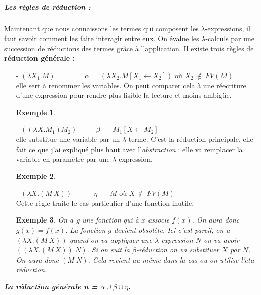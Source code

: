 \documentclass[10pt,a4paper]{report}
\newtheorem{ex}{Exemple}
\begin{document}
\subparagraph{Les règles de réduction :}
Maintenant que nous connaissons les termes qui composent les $\lambda$-expressions, il faut savoir
comment les faire interagir entre eux. On évalue les $\lambda$-calculs par une succession de réductions des termes grâce à
l'application. Il existe trois règles de \textbf{réduction générale :}
\begin{itemize}
\item[-] $(\lambda X_{1}.M)~~~~~~~~~~~~~~~~~~~\alpha~~~~~~~(\lambda X_{2}.M[X_{1} \leftarrow X_{2}])$
  où $X_{2}~\notin~FV(M)$ 
  \\
  elle sert à renommer les variables. On peut comparer cela à une réecriture d'une expression pour rendre plus lisible la lecture et moins ambigüe.
  \begin{ex}
  	
  \end{ex}
\item[-] $((\lambda X.M_{1})M_{2})~~~~~~~~~~~~\beta~~~~~~~~M_{1}[X \leftarrow M_{2}]$ 
\\
elle substitue une variable par un $\lambda$-terme. C'est la réduction principale, elle fait ce que j'ai expliqué plus haut avec l'\textit{abstraction} : elle va remplacer la variable en paramètre par une $\lambda$-expression.
\begin{ex}
	
\end{ex}
\item[-] $(\lambda X.(M~X))~~~~~~~~~~~~~~\eta~~~~~~~~M$ 
  où $X~\notin~FV(M)$ 
  \\ Cette règle traite le cas particulier d'une fonction inutile.
  \begin{ex}
  	On a $g$ une fonction qui à $x$ associe $f(x)$. On aura donc $g(x) = f(x)$. La fonction $g$ devient obsolète. Ici c'est pareil, on a $(\lambda X.(M~X))$ quand on va appliquer une $\lambda$-expression $N$ on va avoir $((\lambda X.(M~X))~N)$. Si on suit la $\beta$-réduction on va substituer $X$ par $N$. On aura donc $(M~N)$. Cela revient au même dans la cas ou on utilise l'$eta$-réduction.
  \end{ex}
\end{itemize}
\medbreak

\textbf{\textit{La réduction générale \textbf{n} = $\alpha \cup \beta \cup \eta$}.}
\bigbreak
\end{document}
